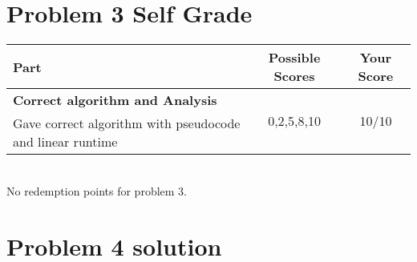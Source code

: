 \documentclass[11pt]{article}
\newcommand{\possible}[2]{\multirow{#1}{*}{#2}}
\newcommand{\outof}[3]{\multirow{#1}{*}{#2/#3}}
\begin{document}
\newpage
\section*{Problem 3 Self Grade}
\begin{center}
\begin{tabular}{|p{8cm}|c|c|}
                                                                            \hline
   Part                       &  Possible Scores  	 & Your Score \\\hline
   {\bf Correct algorithm and Analysis} 	 &  \possible{3}{0,2,5,8,10} & \outof{3}{10}{10} \\
   Gave correct algorithm with pseudocode and linear runtime  && \\ \hline

\end{tabular}
\vspace*{0.2 cm}\\
No redemption points for problem 3.
\end{center}

\newpage
\section*{Problem 4 solution}
\end{document}
